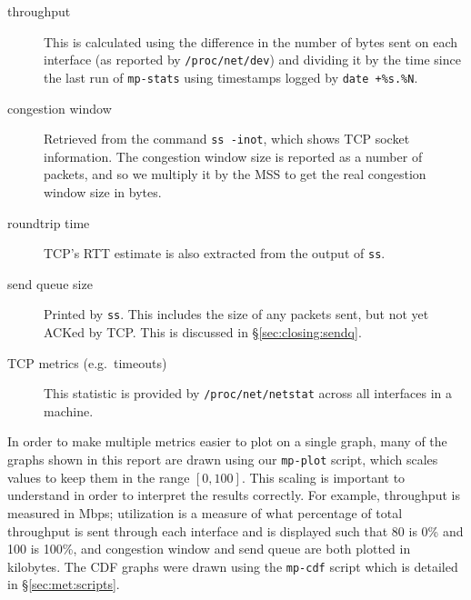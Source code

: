 \begin{description}
  \item[throughput]
    This is calculated using the difference in the number of bytes sent on each
    interface (as reported by \texttt{/proc\-/net/\-dev}) and dividing it by the
    time since the last run of \texttt{mp-stats} using timestamps logged by
    \texttt{date +\%s.\%N}.
  \item[congestion window]
    Retrieved from the command \texttt{ss -inot}, which shows TCP socket
    information. The congestion window size is reported as a number of packets,
    and so we multiply it by the MSS to get the real congestion window size in bytes.
  \item[roundtrip time]
    TCP's RTT estimate is also extracted from the output of \texttt{ss}.
  \item[send queue size]
    Printed by \texttt{ss}. This includes the size of any packets sent, but not
    yet ACKed by TCP. This is discussed in \S\ref{sec:closing:sendq}.
  \item[TCP metrics (e.g.\ timeouts)]
    This statistic is provided by \texttt{/proc\-/net/\-netstat} across all
    interfaces in a machine.
\end{description}

In order to make multiple metrics easier to plot on a single graph, many of the
graphs shown in this report are drawn using our \texttt{mp-plot} script, which
scales values to keep them in the range $[0,100]$. This scaling is important to
understand in order to interpret the results correctly. For example, throughput
is measured in Mbps; utilization is a measure of what percentage of total
throughput is sent through each interface and is displayed such that 80 is 0\% and
100 is 100\%, and congestion window and send queue are both plotted in
kilobytes. The CDF graphs were drawn using the \texttt{mp-cdf} script which is
detailed in \S\ref{sec:met:scripts}.
